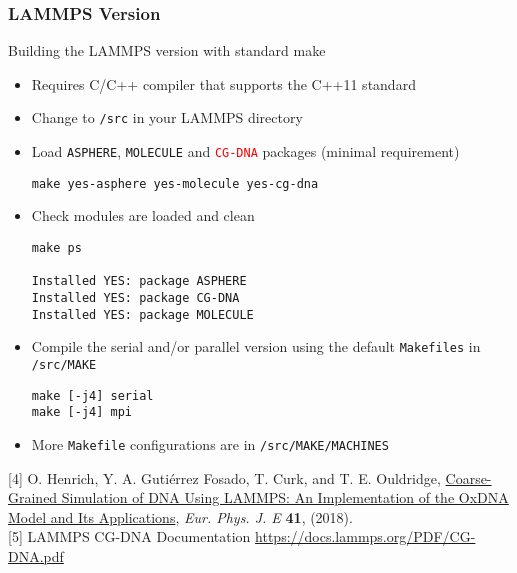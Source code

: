 \documentclass[slidestop,compress,9pt]{beamer}
\begin{document}
\begin{frame}[fragile]
\frametitle{LAMMPS Version}
\small 
Building the LAMMPS version with standard make
\begin{itemize}
\item Requires C/C++ compiler that supports the C++11 standard
\item Change to \texttt{/src} in your LAMMPS directory
\item Load \texttt{ASPHERE}, \texttt{MOLECULE} and \texttt{\textcolor{red}{CG-DNA}} packages (minimal requirement)\\
\linespread{0.4}
\begin{lstlisting}
make yes-asphere yes-molecule yes-cg-dna
\end{lstlisting}
\item Check modules are loaded and clean

\begin{lstlisting}
make ps

Installed YES: package ASPHERE
Installed YES: package CG-DNA
Installed YES: package MOLECULE
\end{lstlisting}

\item Compile the serial and/or parallel version using the default \texttt{Makefiles} in \texttt{/src/MAKE}
\begin{lstlisting}
make [-j4] serial
make [-j4] mpi
\end{lstlisting}
\item More \texttt{Makefile} configurations are in \texttt{/src/MAKE/MACHINES}
\end{itemize}
\linespread{1.0}\vspace*{0.25cm}
[4] O. Henrich, Y. A. Guti\'errez Fosado, T. Curk, and T. E. Ouldridge, \href{https://doi.org/10.1140/epje/i2018-11669-8}{Coarse-Grained Simulation of DNA Using LAMMPS: An Implementation of the OxDNA Model and Its Applications}, \textit{Eur. Phys. J. E} \textbf{41}, (2018).\\[3pt]
[5] LAMMPS CG-DNA Documentation \href{https://docs.lammps.org/PDF/CG-DNA.pdf}{https://docs.lammps.org/PDF/CG-DNA.pdf}
\end{frame}
\end{document}
